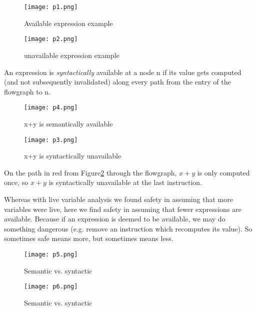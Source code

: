 \begin{figure}[!htb]
      \texttt{[image: p1.png]}
      \caption{Available expression example}\label{fig:p1}
    \endminipage\hfill
      \texttt{[image: p2.png]}
      \caption{unavailable expression example}\label{fig:p2}
    \endminipage
\end{figure}


An expression is \textit{syntactically} available at a node n if its value gets computed 
(and not subsequently invalidated) along every path from the entry of the flowgraph to n.


\begin{figure}[!htb]
      \texttt{[image: p4.png]}
      \caption{x+y is semantically available}\label{fig:p4}
    \endminipage\hfill
      \texttt{[image: p3.png]}
      \caption{x+y is syntactically unavailable}\label{fig:p3}
    \endminipage
\end{figure}


On the path in red from Figure\ref{fig:p3} through the flowgraph, \(x+y\) is only
computed once, so \(x+y\) is syntactically unavailable at the last instruction.


Whereas with live variable analysis we found safety in assuming that 
more variables were live, here we find safety in assuming that fewer
expressions are available. Because if an expression is deemed to be available, we
may do something dangerous (e.g. remove an instruction which recomputes its value).
So sometimes safe means more, but sometimes means less.

\begin{figure}[!htb]
      \texttt{[image: p5.png]}
      \caption{Semantic vs. syntactic}\label{fig:p5}
    \endminipage\hfill
      \texttt{[image: p6.png]}
      \caption{Semantic vs. syntactic}\label{fig:p6}
    \endminipage
\end{figure}



